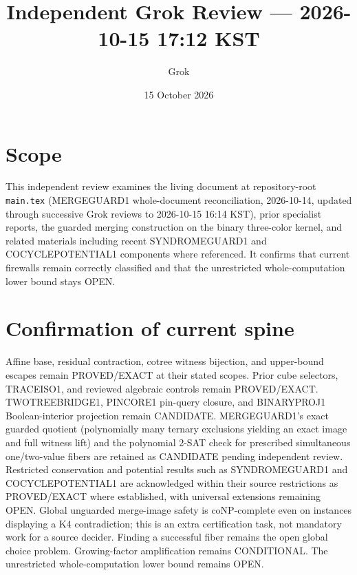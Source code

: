 \documentclass[11pt]{article}
\title{Independent Grok Review --- 2026-10-15 17:12 KST}
\author{Grok}
\date{15 October 2026}
\begin{document}
\maketitle

\begin{center}
\end{center}

\section{Scope}
This independent review examines the living document at repository-root \texttt{main.tex} (MERGEGUARD1 whole-document reconciliation, 2026-10-14, updated through successive Grok reviews to 2026-10-15 16:14 KST), prior specialist reports, the guarded merging construction on the binary three-color kernel, and related materials including recent SYNDROMEGUARD1 and COCYCLEPOTENTIAL1 components where referenced. It confirms that current firewalls remain correctly classified and that the unrestricted whole-computation lower bound stays OPEN.

\section{Confirmation of current spine}
Affine base, residual contraction, cotree witness bijection, and upper-bound escapes remain PROVED/EXACT at their stated scopes. Prior cube selectors, TRACEISO1, and reviewed algebraic controls remain PROVED/EXACT. TWOTREEBRIDGE1, PINCORE1 pin-query closure, and BINARYPROJ1 Boolean-interior projection remain CANDIDATE. MERGEGUARD1's exact guarded quotient (polynomially many ternary exclusions yielding an exact image and full witness lift) and the polynomial 2-SAT check for prescribed simultaneous one/two-value fibers are retained as CANDIDATE pending independent review. Restricted conservation and potential results such as SYNDROMEGUARD1 and COCYCLEPOTENTIAL1 are acknowledged within their source restrictions as PROVED/EXACT where established, with universal extensions remaining OPEN. Global unguarded merge-image safety is coNP-complete even on instances displaying a K4 contradiction; this is an extra certification task, not mandatory work for a source decider. Finding a successful fiber remains the open global choice problem. Growing-factor amplification remains CONDITIONAL. The unrestricted whole-computation lower bound remains OPEN.
\end{document}
